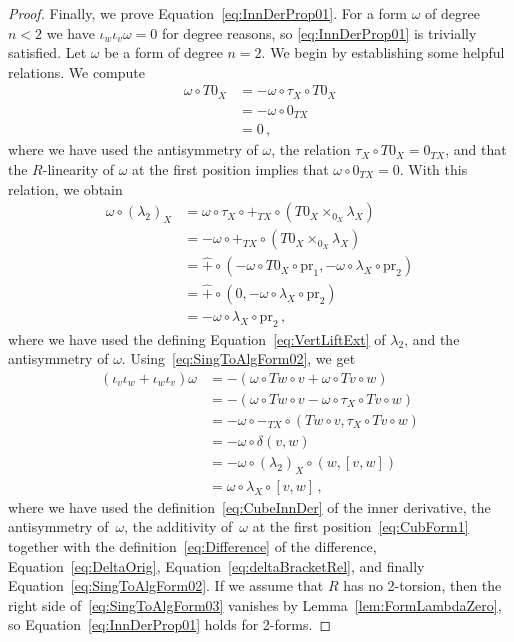 \documentclass[12pt,reqno, a4paper]{amsart}
\numberwithin{equation}{section}
\theoremstyle{plain}
\theoremstyle{definition}
\theoremstyle{remark}
\newcommand{\pr}{\mathrm{pr}}
\newcommand{\Radd}{\hat{+}}
\begin{document}
\begin{proof}
Finally, we prove Equation~\eqref{eq:InnDerProp01}. For a form $\omega$ of degree $n<2$ we have $\iota_w \iota_v \omega = 0$ for degree reasons, so \eqref{eq:InnDerProp01} is trivially satisfied. Let $\omega$ be a form of degree $n=2$. We begin by establishing some helpful relations. We compute
\begin{equation*}
\begin{split}
  \omega \circ T0_X
  &=
  - \omega \circ \tau_X \circ T0_X
  \\
  &=
  - \omega \circ 0_{TX}
  \\
  &= 0
  \,,
\end{split}
\end{equation*}
where we have used the antisymmetry of $\omega$, the relation $\tau_X \circ T0_X = 0_{TX}$, and that the $R$-linearity of $\omega$ at the first position implies that $\omega \circ 0_{TX} = 0$. With this relation, we obtain
\begin{equation}
\label{eq:SingToAlgForm02}
\begin{split}
  \omega \circ (\lambda_2)_X
  &=
  \omega \circ \tau_X \circ +_{TX} \circ (T0_X \times_{0_X} \lambda_X)
  \\
  &=
  - \omega \circ +_{TX} \circ (T0_X \times_{0_X} \lambda_X)
  \\
  &=
  \Radd \circ (- \omega \circ T0_X \circ \pr_1, - \omega \circ \lambda_X \circ \pr_2)
  \\
  &=
  \Radd \circ (0, - \omega \circ \lambda_X \circ \pr_2)
  \\
  &= - \omega \circ \lambda_X \circ \pr_2
  \,,
\end{split}
\end{equation}
where we have used the defining Equation~\eqref{eq:VertLiftExt} of $\lambda_2$, and the antisymmetry of $\omega$. Using~\eqref{eq:SingToAlgForm02}, we get
\begin{equation}
\label{eq:SingToAlgForm03}
\begin{split}
  (\iota_v \iota_w + \iota_w \iota_v)\omega
  &=
  - (\omega \circ Tw \circ v
   + \omega \circ Tv \circ w)
  \\
  &=
  - (\omega \circ Tw \circ v - \omega \circ \tau_X \circ Tv \circ w)
  \\
  &=
  - \omega\circ -_{TX} \circ
  (Tw \circ v, \tau_X \circ Tv \circ w)
  \\
  &=
  - \omega \circ \delta(v,w)
  \\
  &=
  - \omega \circ (\lambda_2)_X \circ (w,[v,w])
  \\
  &=
  \omega \circ \lambda_X \circ [v,w]
  \,,
\end{split}
\end{equation}
where we have used the definition~\eqref{eq:CubeInnDer} of the inner derivative, the antisymmetry of~$\omega$, the additivity of~$\omega$ at the first position~\eqref{eq:CubForm1} together with the definition~\eqref{eq:Difference} of the difference, Equation~\eqref{eq:DeltaOrig}, Equation~\eqref{eq:deltaBracketRel}, and finally Equation~\eqref{eq:SingToAlgForm02}. If we assume that $R$ has no 2-torsion, then the right side of~\eqref{eq:SingToAlgForm03} vanishes by Lemma~\ref{lem:FormLambdaZero}, so Equation~\eqref{eq:InnDerProp01} holds for 2-forms.


\end{proof}
\end{document}
